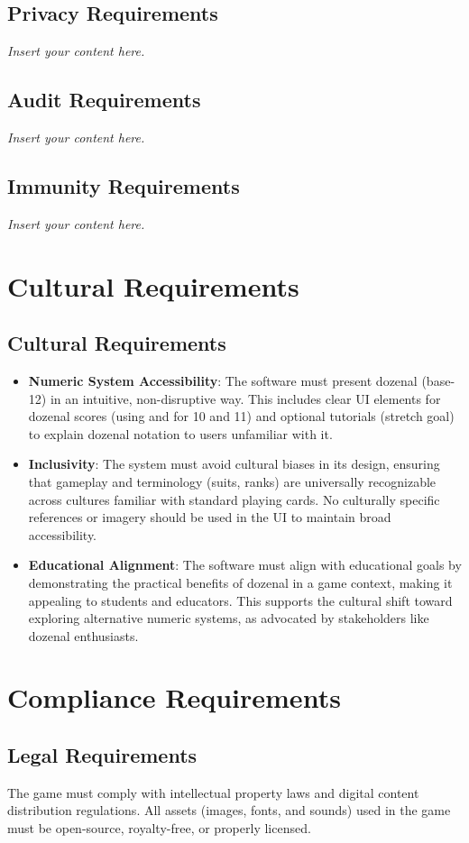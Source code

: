 \documentclass[12pt]{article}
\newcommand{\lips}{\textit{Insert your content here.}}
\begin{document}
\subsection{Privacy Requirements}
\lips
\subsection{Audit Requirements}
\lips
\subsection{Immunity Requirements}
\lips

\section{Cultural Requirements}
\subsection{Cultural Requirements}

\begin{itemize}
    \item \textbf{Numeric System Accessibility}: The software must present dozenal (base-12) in an intuitive, non-disruptive way. This includes clear UI elements for dozenal scores (using  and  for 10 and 11) and optional tutorials (stretch goal) to explain dozenal notation to users unfamiliar with it.
    \item \textbf{Inclusivity}: The system must avoid cultural biases in its design, ensuring that gameplay and terminology (suits, ranks) are universally recognizable across cultures familiar with standard playing cards. No culturally specific references or imagery should be used in the UI to maintain broad accessibility.
    \item \textbf{Educational Alignment}: The software must align with educational goals by demonstrating the practical benefits of dozenal in a game context, making it appealing to students and educators. This supports the cultural shift toward exploring alternative numeric systems, as advocated by stakeholders like dozenal enthusiasts.
\end{itemize}

\section{Compliance Requirements}

\subsection{Legal Requirements}
The game must comply with intellectual property laws and digital content distribution regulations.
All assets (images, fonts, and sounds) used in the game must be open-source, royalty-free, or properly licensed.
\end{document}
